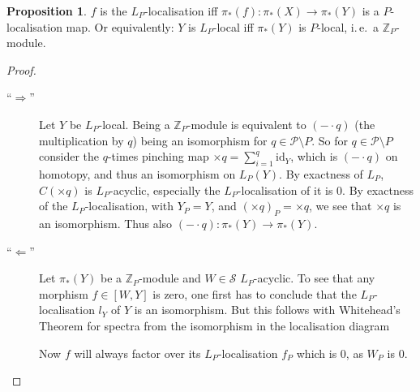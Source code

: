\documentclass[english]{scrartcl}
\theoremstyle{definition}
\newtheorem*{Prop}{Proposition}
\theoremstyle{remark}
\newcommand*{\idest}{i.\,e.\ }
\newcommand*{\ifftext}{iff}
\newcommand*{\Z}[1][]{\mathds{Z}_{#1}}  %
\newcommand*{\id}{\text{id}}
\newcommand*{\Cone}[1]{C(#1)}
\newcommand*{\Spectra}{\mathcal{S}} %
\newcommand*{\Ps}{P}  %
\newcommand*{\PS}{\mathcal{P}} %
\newcommand*{\pistar}[2][*]{\pi_{#1}(#2)}  %
\newcommand*{\timesZ}[1][\Ps]{\otimes_{\Z} \Z[#1]}  %
\newcommand*{\LP}[1][\Ps]{L_{#1}}  %
\begin{document}
\begin{Prop}
  $f$ is the $\LP$-localisation \ifftext{}
  $\pistar f\colon \pistar X\to \pistar Y$ is a
  $\Ps$-localisation map.
  Or equivalently:
  $Y$ is $\LP$-local \ifftext{}
  $\pistar Y$ is $\Ps$-local, \idest a $\Z[\Ps]$-module.
  \begin{proof}
    \begin{description}
    \item[\enquote{$\Rightarrow$}] Let $Y$ be $\LP$-local.
      Being a $\Z[\Ps]$-module is equivalent to $(-\cdot q)$ (the
      multiplication by $q$) being an isomorphism for $q\in\PS\setminus\Ps$.
      So for $q\in\PS\setminus\Ps$ consider the $q$-times pinching map
      $\times q=\sum_{i=1}^q \id_Y$, which is $(-\cdot q)$ on homotopy,
      and thus an isomorphism on $\LP(Y)$.
      By exactness of $\LP$, $\Cone{\times q}$ is $\LP$-acyclic,
      especially the $\LP$-localisation of it is 0.
      By exactness of the $\LP$-localisation, with $Y_{\Ps}=Y$, and
      $(\times q)_{\Ps}=\times q$, we see that $\times q$ is an
      isomorphism. Thus also $(-\cdot q)\colon \pistar Y \to \pistar Y$.
    \item[\enquote{$\Leftarrow$}] Let $\pistar Y$ be a $\Z[\Ps]$-module and
      $W\in\Spectra$ $\LP$-acyclic.
      To see that any morphism $f\in [W,Y]$ is zero, one first has to
      conclude that the $\LP$-localisation $l_Y$ of $Y$ is an
      isomorphism. But this follows with Whitehead's Theorem for
      spectra from the isomorphism in the localisation diagram
      \begin{center}
      \end{center}
      Now $f$ will always factor over its $\LP$-localisation $f_{\Ps}$
      which is 0, as $W_{\Ps}$ is 0.
    \end{description}
  \end{proof}
\end{Prop}
\end{document}
